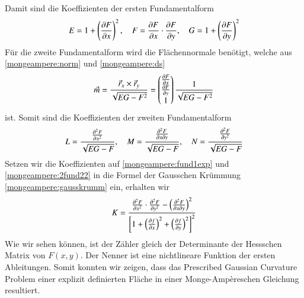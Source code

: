 Damit sind die Koeffizienten der ersten Fundamentalform 
\begin{equation}
  E = 1 + \left(\pdv{F}{x}\right)^2, \quad
  F = \pdv{F}{x} \cdot \pdv{F}{y}, \quad
  G = 1 + \left(\pdv{F}{y}\right)^2
  \label{mongeampere:fund1exp}
\end{equation}
Für die zweite Fundamentalform wird die Flächennormale benötigt, welche aus \eqref{mongeampere:norm} und \eqref{mongeampere:ds} 
\begin{equation}
  \vec m = \frac{\vec r_x \times \vec r_y}{\sqrt{EG-F^2}} = \begin{pmatrix}
    \pdv{F}{x} \\
    \pdv{F}{y} \\
    1
  \end{pmatrix}
  \frac{1}{\sqrt{EG-F^2}}
  \label{mongeampere:norm2}
\end{equation}
ist.
Somit sind die Koeffizienten der zweiten Fundamentalform
\begin{equation}
  L = \frac{\pdv[2]{F}{x}}{\sqrt{EG-F}}, \quad
  M = \frac{\pdv{F}{x}{y}}{\sqrt{EG-F}}, \quad
  N = \frac{\pdv[2]{F}{y}}{\sqrt{EG-F}}
  \label{mongeampere:2fund22}
\end{equation}
Setzen wir die Koeffizienten auf \eqref{mongeampere:fund1exp} und \eqref{mongeampere:2fund22} in die Formel der Gausschen Krümmung \eqref{mongeampere:gausskrumm}
ein, erhalten wir
\begin{equation}
  K = \frac{
    \pdv[2]{F}{x} \cdot \pdv[2]{F}{y} - \left(\pdv{F}{x}{y} \right)^2}
    {\left[1 + 
    \left(\pdv{f}{x}\right)^2 +
    \left(\pdv{f}{y}\right)^2\right]^2}
  \label{mongeampere:pd}
\end{equation}
Wie wir sehen können, ist der Zähler gleich der Determinante der Hessschen Matrix von $F(x,y)$.
Der Nenner ist eine nichtlineare Funktion der ersten Ableitungen.
Somit konnten wir zeigen, dass das Prescribed Gaussian Curvature Problem einer explizit definierten Fläche in einer 
Monge-Ampèreschen Gleichung resultiert.

